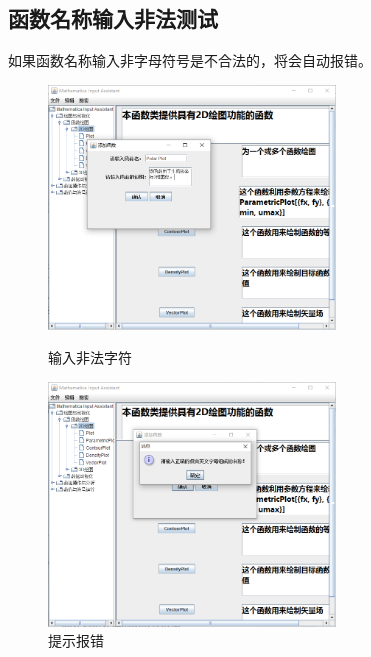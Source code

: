 \documentclass[hyperref, UTF8
,bookmarksnumbered=true, oneside]{ctexbook}
\begin{document}
		\subsection{函数名称输入非法测试} %
		如果函数名称输入非字母符号是不合法的，将会自动报错。
		\begin{figure}[!h]
	        \begin{minipage}[b]{0.45\textwidth}
	        \centering
	        \includegraphics[width=3in]{22.png}
	        \caption{输入非法字符}
	        \label{pic:MathPack}
	        \end{minipage}%
	        \hspace{0.1\textwidth}%
	        \begin{minipage}[b]{0.45\textwidth}
	        \centering
	        \includegraphics[width=3in]{21.png}
	        \caption{提示报错}
	        \label{pic:GUIPack}
	        \end{minipage}
        \end{figure}
		
\end{document}

